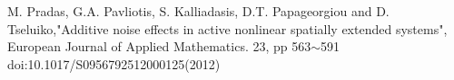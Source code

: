 \documentclass[autodetect-engine,dvipdfmx-if-dvi,ja=standard,a4paper,11pt]{bxjsarticle} %
\begin{document}









\begin{thebibliography}{9999}%
M. Pradas, G.A. Pavliotis, S. Kalliadasis, D.T. Papageorgiou and D. Tseluiko,"Additive noise
effects in active nonlinear spatially extended systems", European Journal of Applied Mathematics.
23, pp 563$\sim$591 doi:10.1017/S0956792512000125(2012)
\end{thebibliography}

\end{document}
